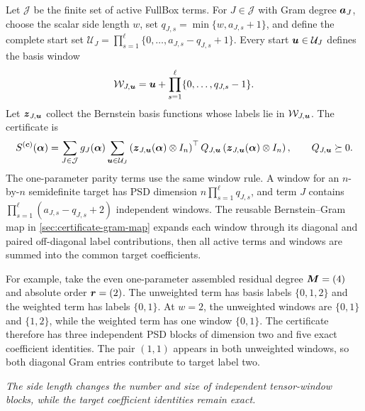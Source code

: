 Let $\mathcal J$ be the finite set of active FullBox terms. For $J\in\mathcal J$ with Gram degree $\boldsymbol{a}_J$, choose the scalar side length $w$, set $q_{J,s}=\min\{w,a_{J,s}+1\}$, and define the complete start set $\mathcal U_J=\prod_{s=1}^{\ell}\{0,\ldots,a_{J,s}-q_{J,s}+1\}$. Every start $\boldsymbol{u}\in\mathcal U_J$ defines the basis window
\begin{gather*}
\mathcal W_{J,\boldsymbol{u}}=\boldsymbol{u}+\prod_{s=1}^{\ell}\{0,\ldots,q_{J,s}-1\}.
\end{gather*}
Let $\boldsymbol{z}_{J,\boldsymbol{u}}$ collect the Bernstein basis functions whose labels lie in $\mathcal W_{J,\boldsymbol{u}}$. The certificate is
\begin{gather*}
S^{(\boldsymbol{c})}(\boldsymbol{\alpha})=
\sum_{J\in\mathcal J}g_J(\boldsymbol{\alpha})\sum_{\boldsymbol{u}\in\mathcal U_J}
\left(\boldsymbol{z}_{J,\boldsymbol{u}}(\boldsymbol{\alpha})\otimes I_n\right)^\top
Q_{J,\boldsymbol{u}}
\left(\boldsymbol{z}_{J,\boldsymbol{u}}(\boldsymbol{\alpha})\otimes I_n\right),
\qquad Q_{J,\boldsymbol{u}}\succeq0.
\end{gather*}
The one-parameter parity terms use the same window rule. A window for an $n$-by-$n$ semidefinite target has PSD dimension $n\prod_{s=1}^{\ell} q_{J,s}$, and term $J$ contains $\prod_{s=1}^{\ell}(a_{J,s}-q_{J,s}+2)$ independent windows. The reusable Bernstein--Gram map in \cref{sec:certificate-gram-map} expands each window through its diagonal and paired off-diagonal label contributions, then all active terms and windows are summed into the common target coefficients.

For example, take the even one-parameter assembled residual degree $\boldsymbol{M}=(4)$ and absolute order $\boldsymbol{r}=(2)$. The unweighted term has basis labels $\{0,1,2\}$ and the weighted term has labels $\{0,1\}$. At $w=2$, the unweighted windows are $\{0,1\}$ and $\{1,2\}$, while the weighted term has one window $\{0,1\}$. The certificate therefore has three independent PSD blocks of dimension two and five exact coefficient identities. The pair $(1,1)$ appears in both unweighted windows, so both diagonal Gram entries contribute to target label two.

\begin{center}

\textit{The side length changes the number and size of independent tensor-window blocks, while the target coefficient identities remain exact.}
\end{center}

